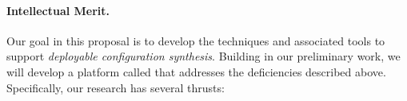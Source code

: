 
\paragraph*{Intellectual Merit.}
Our goal in this proposal is to develop the techniques and associated tools
to support {\em deployable configuration synthesis}.  Building in our preliminary work, we will develop a platform called \Name that addresses the deficiencies described above.  Specifically, our research has several thrusts:

